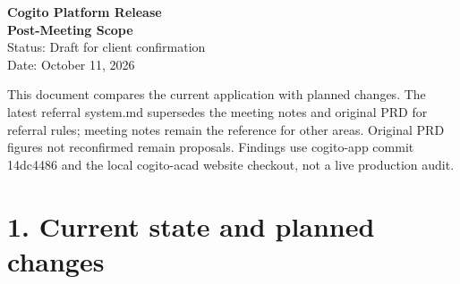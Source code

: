 \documentclass[11pt,a4paper]{article}
\begin{document}
\begin{center}
{\LARGE \textbf{Cogito Platform Release}}\\[4pt]
{\Large \textbf{Post-Meeting Scope}}\\[8pt]
{\normalsize Status: Draft for client confirmation}\\
{\normalsize Date: October 11, 2026}
\end{center}
\vspace{1em}


This document compares the current application with planned changes. The latest referral system.md supersedes the meeting notes and original PRD for referral rules; meeting notes remain the reference for other areas. Original PRD figures not reconfirmed remain proposals. Findings use cogito-app commit 14dc4486 and the local cogito-acad website checkout, not a live production audit.

\section*{1. Current state and planned changes}
\end{document}
